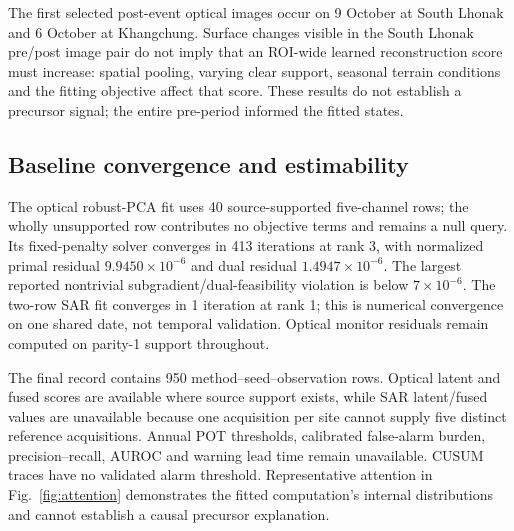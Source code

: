 The first selected post-event optical images occur on 9 October at South Lhonak and 6 October at Khangchung. Surface changes visible in the South Lhonak pre/post image pair do not imply that an ROI-wide learned reconstruction score must increase: spatial pooling, varying clear support, seasonal terrain conditions and the fitting objective affect that score. These results do not establish a precursor signal; the entire pre-period informed the fitted states.

\subsection{Baseline convergence and estimability}
The optical robust-PCA fit uses 40 source-supported five-channel rows; the wholly unsupported row contributes no objective terms and remains a null query. Its fixed-penalty solver converges in 413 iterations at rank 3, with normalized primal residual $9.9450\times10^{-6}$ and dual residual $1.4947\times10^{-6}$. The largest reported nontrivial subgradient/dual-feasibility violation is below $7\times10^{-6}$. The two-row SAR fit converges in 1 iteration at rank 1; this is numerical convergence on one shared date, not temporal validation. Optical monitor residuals remain computed on parity-1 support throughout.

The final record contains 950 method--seed--observation rows. Optical latent and fused scores are available where source support exists, while SAR latent/fused values are unavailable because one acquisition per site cannot supply five distinct reference acquisitions. Annual POT thresholds, calibrated false-alarm burden, precision--recall, AUROC and warning lead time remain unavailable. CUSUM traces have no validated alarm threshold. Representative attention in Fig.~\ref{fig:attention} demonstrates the fitted computation's internal distributions and cannot establish a causal precursor explanation.

